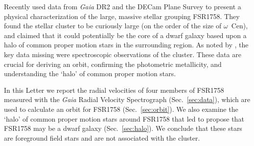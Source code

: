 \documentclass[fleqn,usenatbib]{mnras}
\begin{document}
Recently \citet[][hereafter ]{Barba2018} used data from \textit{Gaia} DR2 and the DECam Plane Survey \citep[DECaPS;][]{Schlafly2018} to present a physical characterization of the large, massive stellar grouping FSR1758. They found the stellar cluster to be curiously large (on the order of the size of $\omega$~Cen), and claimed that it could potentially be the core of a dwarf galaxy based upon a halo of common proper motion stars in the surrounding region. As noted by , the key data missing were spectroscopic observations of the cluster. These data are crucial for deriving an orbit, confirming the photometric metallicity, and understanding the `halo' of common proper motion stars.

In this Letter we report the radial velocities of four members of FSR1758 measured with the \textit{Gaia} Radial Velocity Spectrograph \citep[RVS;][]{Cropper2018,GaiaCollaboration:2018fx} (Sec.\ \ref{sec:data}), which are used to calculate an orbit for FSR1758 (Sec.\ \ref{sec:orbit}). We also examine the `halo' of common proper motion stars around FSR1758 that led  to propose that FSR1758 may be a dwarf galaxy (Sec.\  \ref{sec:halo}). We conclude that these stars are foreground field stars and are not associated with the cluster.
\end{document}
